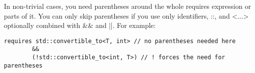 In non-trivial cases, you need parentheses around the whole requires expression or parts of it. You can only skip parentheses if you use only identifiers, ::, and <...> optionally combined with \&\& and ||. For example:

\begin{lstlisting}[style=styleCXX]
requires std::convertible_to<T, int> // no parentheses needed here
		&&
		(!std::convertible_to<int, T>) // ! forces the need for parentheses
\end{lstlisting}


























